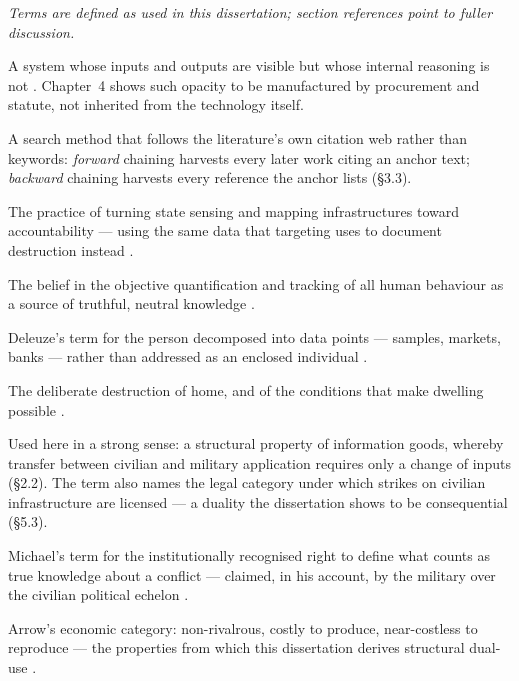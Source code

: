 \documentclass[12pt,a4paper,twoside]{report}
\begin{document}
\begin{singlespace}
\noindent\textit{Terms are defined as used in this dissertation; section references point to fuller discussion.}

\begin{description}[style=nextline,itemsep=2pt]
\item[Black box] A system whose inputs and outputs are visible but whose internal reasoning is not \parencite{pasquale2015}. Chapter~4 shows such opacity to be manufactured by procurement and statute, not inherited from the technology itself.
\item[Citation chaining (snowballing)] A search method that follows the literature's own citation web rather than keywords: \emph{forward} chaining harvests every later work citing an anchor text; \emph{backward} chaining harvests every reference the anchor lists (§3.3).
\item[Counter-forensics] The practice of turning state sensing and mapping infrastructures toward accountability — using the same data that targeting uses to document destruction instead \parencite{weizman2017}.
\item[Dataism] The belief in the objective quantification and tracking of all human behaviour as a source of truthful, neutral knowledge \parencite{vandijck2014}.
\item[Dividual] Deleuze's term for the person decomposed into data points — samples, markets, banks — rather than addressed as an enclosed individual \parencite{deleuze1990}.
\item[Domicide] The deliberate destruction of home, and of the conditions that make dwelling possible \parencite{king2004}.
\item[Dual-use] Used here in a strong sense: a structural property of information goods, whereby transfer between civilian and military application requires only a change of inputs (§2.2). The term also names the legal category under which strikes on civilian infrastructure are licensed — a duality the dissertation shows to be consequential (§5.3).
\item[Epistemic authority] Michael's term for the institutionally recognised right to define what counts as true knowledge about a conflict — claimed, in his account, by the military over the civilian political echelon \parencite{michael2007}.
\item[Information good] Arrow's economic category: non-rivalrous, costly to produce, near-costless to reproduce — the properties from which this dissertation derives structural dual-use \parencite{arrow1962}.

\end{description}
\end{singlespace}
\end{document}
